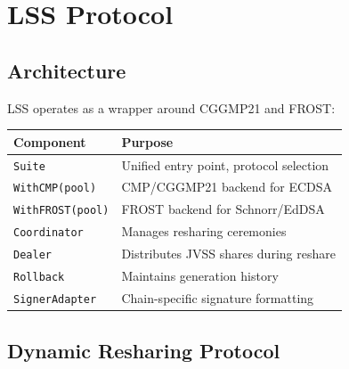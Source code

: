 \section{LSS Protocol}


\subsection{Architecture}

LSS operates as a wrapper around CGGMP21 and FROST:

\begin{center}
\begin{tabular}{ll}
\toprule
\textbf{Component} & \textbf{Purpose} \\
\midrule
\texttt{Suite} & Unified entry point, protocol selection \\
\texttt{WithCMP(pool)} & CMP/CGGMP21 backend for ECDSA \\
\texttt{WithFROST(pool)} & FROST backend for Schnorr/EdDSA \\
\texttt{Coordinator} & Manages resharing ceremonies \\
\texttt{Dealer} & Distributes JVSS shares during reshare \\
\texttt{Rollback} & Maintains generation history \\
\texttt{SignerAdapter} & Chain-specific signature formatting \\
\bottomrule
\end{tabular}
\end{center}

\subsection{Dynamic Resharing Protocol}

